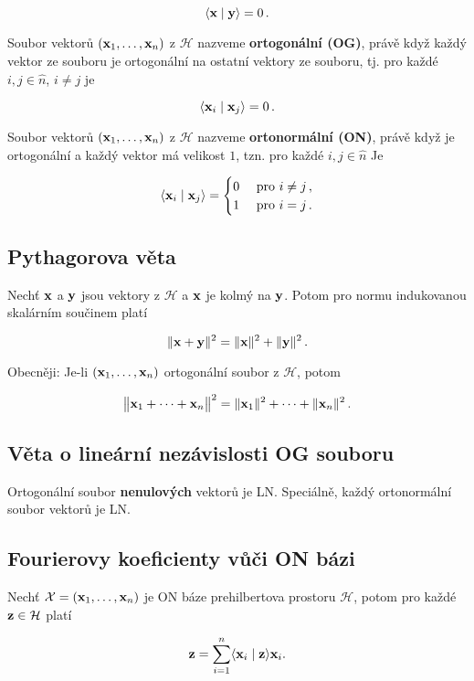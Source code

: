 \[ \langle \mathbf{x}\mid \mathbf{y}\rangle =0\,. \]

\noindent Soubor vektorů $(\mathbf{x}_1,\dots,\mathbf{x}_n)$ z $\mathcal{H}$ nazveme
\textbf{ortogonální (OG)}, právě když každý vektor ze souboru je ortogonální na
ostatní vektory ze souboru, tj. pro každé $i,j\in\hat{n}$, $i\neq j$ je

\[ \langle \mathbf{x}_{i}\mid \mathbf{x}_{j}\rangle=0\,. \]

\noindent Soubor vektorů $(\mathbf{x}_1,\dots,\mathbf{x}_n)$ z $\mathcal{H}$ nazveme
\textbf{ortonormální (ON)}, právě když je ortogonální a každý vektor má
velikost $1$, tzn. pro každé $i,j\in\hat{n}$ Je

\[ \langle \mathbf{x}_{i}\mid \mathbf{x}_{j}\rangle=
    \begin{cases}
        0 & \text{ pro }i\neq j\,, \\
        1 & \text{ pro }i=j\,.
    \end{cases} \]

\subsection*{Pythagorova věta}

Nechť $\mathbf{x}$ a $\mathbf{y}$ jsou vektory z $\mathcal H$ a $\mathbf{x}$ je kolmý na $\mathbf{y}$.
Potom pro normu indukovanou skalárním součinem platí

\[ \|\mathbf{x}+\mathbf{y}\|^{2}=\|\mathbf{x}\|^{2}+\|\mathbf{y}\|^{2}\,. \]

\noindent Obecněji: Je-li $(\mathbf{x}_1,\dots,\mathbf{x}_n)$ ortogonální soubor z $\mathcal H$, potom

\[ \big\|\mathbf{x}_1+\dots+\mathbf{x}_n\big\|^{2}=\|\mathbf{x}_1\|^{2}+\dots+\|\mathbf{x}_n\|^{2}\,. \]

\subsection*{Věta o lineární nezávislosti OG souboru}

Ortogonální soubor \textbf{nenulových} vektorů je LN. Speciálně, každý
ortonormální soubor vektorů je LN.

\subsection*{Fourierovy koeficienty vůči ON bázi}

Nechť $\mathcal{X}=(\mathbf{x}_1,\dots, \mathbf{x}_n)$ je ON báze prehilbertova prostoru
$\mathcal{H}$, potom pro každé $\mathbf{z}\in\mathcal{H}$ platí

\[ \mathbf{z}=\sum_{i=1}^n \langle \mathbf{x}_i\mid \mathbf{z}\rangle \mathbf{x}_i. \]

